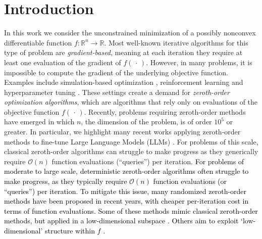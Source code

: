 \section{Introduction}
In this work we consider the unconstrained minimization of a possibly nonconvex differentiable function $f:\mathbb{R}^{n}\to\mathbb{R}$. Most well-known iterative algorithms for this type of problem are {\em gradient-based}, meaning at each iteration they require at least one evaluation of the gradient of $f(\,\cdot\,)$. However, in many problems, it is impossible to compute the gradient of the underlying objective function. Examples include simulation-based optimization \cite{Nakamura2017}, reinforcement learning \cite{salimans2017evolution,mania2018simple,choromanski2020provably} and hyperparameter tuning \cite{bergstra2012random,tett2022calibrating}. These settings create a demand for {\em zeroth-order optimization algorithms}, which are algorithms that rely only on evaluations of the objective function $f(\,\cdot\,)$. Recently, problems requiring zeroth-order methods have emerged in which $n$, the dimension of the problem, is of order $10^5$ or greater. In particular, we highlight many recent works applying zeroth-order methods to fine-tune Large Language Models (LLMs) \cite{malladi2024fine,zhang2024revisiting,liu2024sparse,chen2023deepzero}. For problems of this scale, classical zeroth-order algorithms can struggle to make progress as they generically require $\mathcal{O}(n)$ function evaluations (``queries'') per iteration. \textcolor{black}{For problems of moderate to large scale, deterministic zeroth-order algorithms often struggle to make progress, as they typically require $\mathcal{O}(n)$ function evaluations (or ``queries'') per iteration. To mitigate this issue, many randomized zeroth-order methods have been proposed in recent years, with cheaper per-iteration cost in terms of function evaluations. Some of these methods mimic classical zeroth-order methods, but applied in a low-dimensional subspace \cite{Nesterov,Bergou,Kozak,Cartis,Roberts}. Others aim to exploit `low-dimensional' structure within $f$ \cite{Bandeira,cartis2022dimensionality,cartis2023bound,wang2016bayesian,Yue2023zeroth}.}

